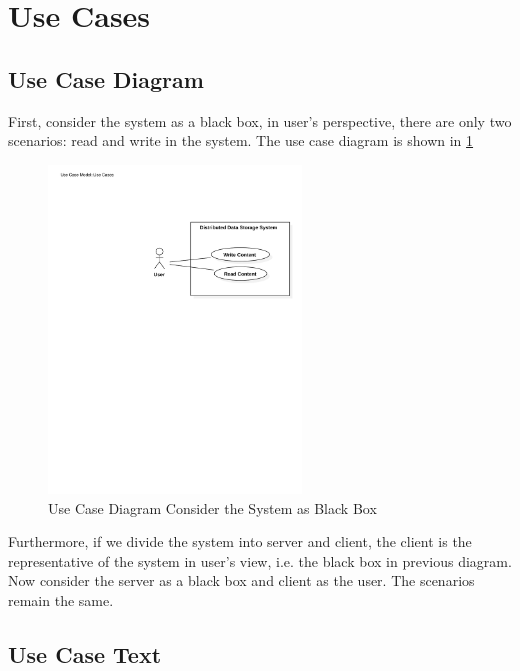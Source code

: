 \documentclass[11pt,letterpaper,en-US]{article}
\begin{document}
\section{Use Cases}
\subsection{Use Case Diagram}
First, consider the system as a black box,
in user's perspective, there are only two scenarios: read and write in the system.
The use case diagram is shown in \cref{ucdori}
\begin{figure}[!htb]
    \caption{Use Case Diagram Consider the System as Black Box}
    \label{ucdori}
    \centering
    \includegraphics[width = 0.6\textwidth]{usecaseori}
\end{figure}

Furthermore, if we divide the system into server and client,
the client is the representative of the system in user's view, i.e.
the black box in previous diagram.
Now consider the server as a black box and client as the user.
The scenarios remain the same.

\subsection{Use Case Text}
\end{document}
